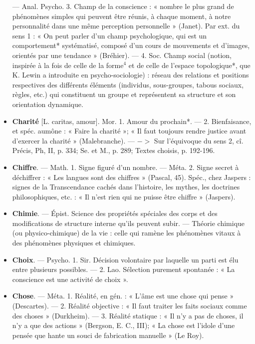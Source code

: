 \begin{itemize}[leftmargin=1cm, label=, itemsep=11pt]
— Anal. Psycho. 3. Champ de la
conscience : « nombre le plus grand
de phénomènes simples qui peuvent
être réunis, à chaque moment, à
notre personnalité dans une même
perception personnelle » (Janet).
Par ext. du sens 1 : « On peut parler
d’un champ psychologique, qui est
un comportement*  systématisé,
composé d’un cours de mouvements
et d'images, orientés par une tendance » (Bréhier). — 4. Soc. Champ
social (notion, inspirée à la fois de
celle de la forme$^4$ et de celle de
l’espace topologique*, que K. Lewin
a introduite en psycho-sociologie) :
réseau des relations et positions respectives des différents éléments
(individus, sous-groupes, tabous sociaux, règles, etc.) qui constituent
un groupe et représentent sa structure et son orientation dynamique.

\item {\bf Charité} [L. caritas, amour]. Mor. 1.
Amour du prochain*. — 2. Bienfaisance, et spéc. aumône : « Faire la
charité »; « Il faut toujours rendre
justice avant d'exercer la charité »
(Malebranche). — $->$ Sur l'équivoque du sens 2, cî. Précis, Ph, II,
p. 334; Se. et M., p. 289; Textes
choisis, p. 192-196.

\item {\bf Chiffre}. — Math. 1. Signe figuré d’un
nombre. — Méta. 2. Signe secret à
déchiffrer : « Les langues sont des
chiffres » (Pascal, 45). Spéc., chez
Jaspers : signes de la Transcendance
cachés dans l’histoire, les mythes,
les doctrines philosophiques, etc. :
« Il n'est rien qui ne puisse être
chiffre » (Jaspers).

\item {\bf Chimie}. — Épist. Science des propriétés spéciales des corps et des
modifications de structure interne
qu'ils peuvent subir. — Théorie
chimique (ou physico-chimique) de
la vie : celle qui ramène les phénomènes vitaux à des phénomènes
physiques et chimiques.

\item {\bf Choix}. — Psycho. 1. Sir. Décision volontaire par laquelle un parti est élu
entre plusieurs possibles. — 2. Lao.
Sélection purement spontanée :
« La conscience est une activité de
choix ».

\item {\bf Chose}. — Méta. 1. Réalité, en gén. :
« L'âme est une chose qui pense »
(Descartes). — 2. Réalité objective :
« Il faut traiter les faits sociaux
comme des choses » (Durkheim). —
3. Réalité statique : « Il n’y a pas
de choses, il n’y a que des actions »
(Bergson, E. C., III); « La chose est
l’idole d’une pensée que hante un
souci de fabrication manuelle »
(Le Roy).


\end{itemize}
